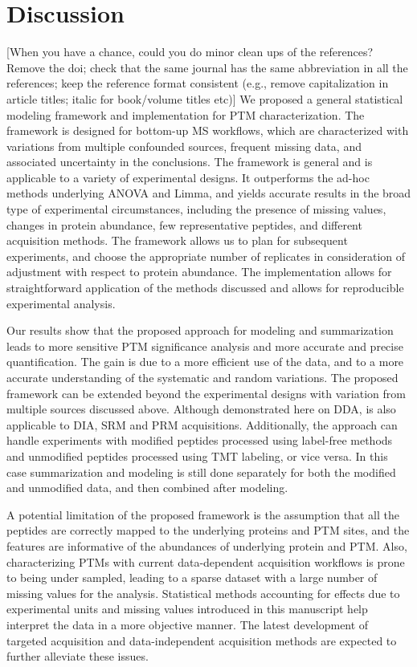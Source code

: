 \documentclass[mcp]{article}
\numberwithin{table}{section}
\def\todo#1{{\color{red}[#1]}}
\begin{document}
\section{Discussion}

\todo{When you have a chance, could you do minor clean ups of the references? Remove the doi; check that the same journal has the same abbreviation in all the references; keep the reference format consistent (e.g., remove capitalization in article titles; italic for book/volume titles etc)} We proposed a general statistical modeling framework and implementation for PTM characterization. The framework is designed for bottom-up MS workflows, which are characterized with variations from multiple confounded sources, frequent missing data, and associated uncertainty in the conclusions. The framework is general and is applicable to a variety of experimental designs. It outperforms the ad-hoc methods underlying ANOVA and Limma, and yields accurate results in the broad type of experimental circumstances, including the presence of missing values, changes in protein abundance, few representative peptides, and different acquisition methods. The framework allows us to plan for subsequent experiments, and choose the appropriate number of replicates in consideration of adjustment with respect to protein abundance. The implementation allows for straightforward application of the methods discussed and allows for reproducible experimental analysis.

Our results show that the proposed approach for modeling and summarization leads to more sensitive PTM significance analysis and more accurate and precise quantification. The gain is due to a more efficient use of the data, and to a more accurate understanding of the systematic and random variations. The proposed framework can be extended beyond the experimental designs with variation from multiple sources discussed above. Although demonstrated here on DDA, is also applicable to DIA, SRM and PRM acquisitions. Additionally, the approach can handle experiments with modified peptides processed using label-free methods and unmodified peptides processed using TMT labeling, or vice versa. In this case summarization and modeling is still done separately for both the modified and unmodified data, and then combined after modeling.

A potential limitation of the proposed framework is the assumption that all the peptides are correctly mapped to the underlying proteins and PTM sites, and the features are informative of the abundances of underlying protein and PTM. Also, characterizing PTMs with current data-dependent acquisition workflows is prone to being under sampled, leading to a sparse dataset with a large number of missing values for the analysis. Statistical methods accounting for effects due to experimental units and missing values introduced in this manuscript help interpret the data in a more objective manner. The latest development of targeted acquisition and data-independent acquisition methods are expected to further alleviate these issues. 
\end{document}
